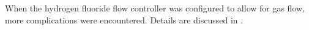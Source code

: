 


When the hydrogen fluoride flow controller was configured to allow for gas
flow, more complications were encountered. Details are discussed in
. \par

\pagebreak
